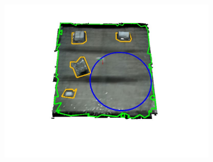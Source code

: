 \begin{figure}[!htb]
\begin{subfigure}[t]{.29\linewidth}
    \caption{\label{fig:ch7_flight_mesh_b}}
  \end{subfigure}
  \begin{subfigure}[t]{.29\linewidth}
    \centering  \includegraphics[page=3,clip,trim=3.5cm 3cm 3.5cm 1.0cm,width=.99\linewidth]{chapter_7_experiments/imgs/mesh_flight.pdf}
    \caption{\label{fig:ch7_flight_mesh_c}}
  \end{subfigure}
  

\end{figure}
